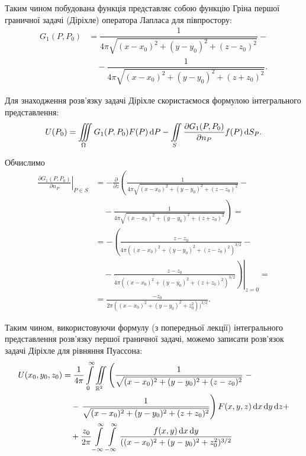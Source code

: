 Таким чином побудована функція представляє собою функцію Гріна першої граничної задачі (Діріхле) оператора Лапласа для півпростору:
\begin{equation}
	\begin{aligned}
		G_1(P, P_0) &= \dfrac{1}{4 \pi \sqrt{(x - x_0)^2 + (y - y_0)^2 + (z - z_0)^2}} - \\
		& \quad - \dfrac{1}{4 \pi \sqrt{(x - x_0)^2 + (y - y_0)^2 + (z + z_0)^2}}.
	\end{aligned}
\end{equation}

Для знаходження розв'язку задачі Діріхле скористаємося формулою інтегрального представлення:
\begin{equation}
	U(P_0) = \displaystyle\iiint\limits_\Omega G_1(P, P_0) F(P) \mathop{}\!\mathrm{d} P - \displaystyle\iint\limits_S \frac{\partial G_1(P, P_0)}{\partial n_P} f(P) \mathop{}\!\mathrm{d} S_P.
\end{equation}

Обчислимо
\begin{equation}
	\begin{aligned}
		\left. \frac{\partial G_1(P, P_0)}{\partial n_P} \right|_{P \in S} &= - \frac{\partial}{\partial z} \left( \frac{1}{4 \pi \sqrt{(x - x_0)^2 + (y - y_0)^2 + (z - z_0)^2}} \right.- \\
		& \quad - \left. \frac{1}{4 \pi \sqrt{(x - x_0)^2 + (y - y_0)^2 + (z + z_0)^2}} \right) = \\
		& = - \left( \frac{z - z_0}{4 \pi ((x - x_0)^2 + (y - y_0)^2 + (z - z_0)^2)^{3/2}} \right. - \\
		& \quad - \left. \left. \frac{z - z_0}{4 \pi ((x - x_0)^2 + (y - y_0)^2 + (z + z_0)^2)^{3/2}} \right) \right|_{z = 0} = \\
		& = \frac{-z_0}{2 \pi( (x - x_0)^2 + (y - y_0)^2 + z_0^2))^{3 / 2}}.
	\end{aligned}
\end{equation}

Таким чином, використовуючи формулу  (з попередньої лекції) інтегрального представлення розв'язку першої граничної задачі, можемо записати розв'язок задачі Діріхле для рівняння Пуассона:
\begin{equation}
	\begin{aligned}
		U(x_0, y_0, z_0) &= \frac{1}{4 \pi} \displaystyle\int\limits_0^\infty \displaystyle\iint\limits_{\mathbb{R}^2} \left( \frac{1}{\sqrt{(x - x_0)^2 + (y - y_0)^2 + (z - z_0)^2}} \right. - \\
		& \quad - \left. \frac{1}{\sqrt{(x - x_0)^2 + (y - y_0)^2 + (z + z_0)^2}} \right) F(x, y, z) \mathop{}\!\mathrm{d} x \mathop{}\!\mathrm{d} y \mathop{}\!\mathrm{d} z + \\
		& \quad + \frac{z_0}{2 \pi} \displaystyle\int\limits_{-\infty}^\infty \displaystyle\int\limits_{-\infty}^\infty \frac{f(x, y) \mathop{}\!\mathrm{d} x \mathop{}\!\mathrm{d} y}{((x - x_0)^2 + (y - y_0)^2 + z_0^2)^{3/2}}
	\end{aligned}
\end{equation}

